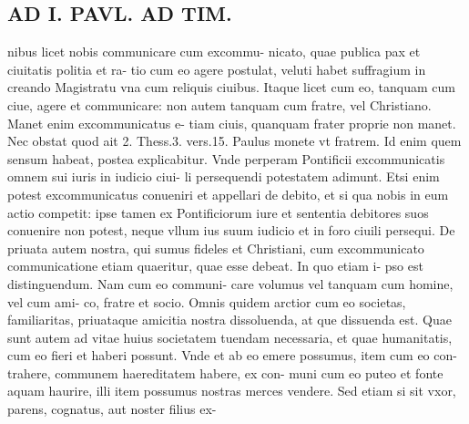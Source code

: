 \documentclass{article}
\begin{document}
\begin{pages}
\section*{AD I. PAVL. AD TIM. }
\marginpar{[ p.404 ]}\pstart nibus licet nobis communicare cum excommu- nicato, quae publica pax et ciuitatis politia et ra- tio cum eo agere postulat, veluti habet suffragium in creando Magistratu vna cum reliquis ciuibus. Itaque licet cum eo, tanquam cum ciue, agere et communicare: non autem tanquam cum fratre, vel Christiano. Manet enim excommunicatus e- tiam ciuis, quanquam frater proprie non manet. Nec obstat quod ait 2. Thess.3. vers.15. Paulus monete vt fratrem. Id enim quem sensum habeat, postea explicabitur. Vnde perperam Pontificii excommunicatis omnem sui iuris in iudicio ciui- li persequendi potestatem adimunt. Etsi enim potest excommunicatus conueniri et appellari de debito, et si qua nobis in eum actio competit: ipse tamen ex Pontificiorum iure et sententia debitores suos conuenire non potest, neque vllum ius suum iudicio et in foro ciuili persequi. De priuata autem nostra, qui sumus fideles et Christiani, cum excommunicato communicatione etiam quaeritur, quae esse debeat. In quo etiam i- pso est distinguendum. Nam cum eo communi- care volumus vel tanquam cum homine, vel cum ami- co, fratre et socio. Omnis quidem arctior cum eo societas, familiaritas, priuataque amicitia nostra dissoluenda, at que dissuenda est. Quae sunt autem ad vitae huius societatem tuendam necessaria, et quae humanitatis, cum eo fieri et haberi possunt. Vnde et ab eo emere possumus, item cum eo con- trahere, communem haereditatem habere, ex con- muni cum eo puteo et fonte aquam haurire, illi item possumus nostras merces vendere. Sed etiam si sit vxor, parens, cognatus, aut noster filius ex-  \pend

\end{pages}
\end{document}
